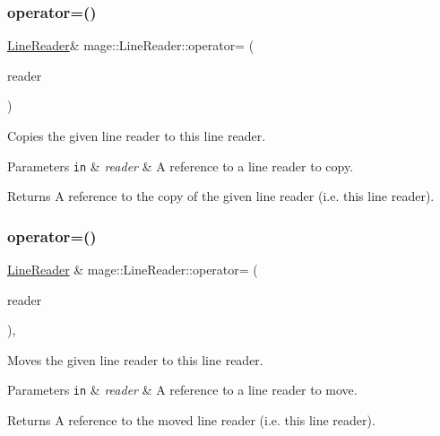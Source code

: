 \subsubsection{\texorpdfstring{operator=()}{operator=()}\hspace{0.1cm}{\footnotesize\ttfamily [1/2]}}
{\footnotesize\ttfamily \hyperlink{classmage_1_1_line_reader}{Line\+Reader}\& mage\+::\+Line\+Reader\+::operator= (\begin{DoxyParamCaption}\item[{const \hyperlink{classmage_1_1_line_reader}{Line\+Reader} \&}]{reader }\end{DoxyParamCaption})\hspace{0.3cm}{\ttfamily [delete]}}

Copies the given line reader to this line reader.


\begin{DoxyParams}[1]{Parameters}
\mbox{\tt in}  & {\em reader} & A reference to a line reader to copy. \\
\hline
\end{DoxyParams}
\begin{DoxyReturn}{Returns}
A reference to the copy of the given line reader (i.\+e. this line reader). 
\end{DoxyReturn}
\hypertarget{classmage_1_1_line_reader_a3ba691cb32a1ab5dcbe75498068c1b86}{}\label{classmage_1_1_line_reader_a3ba691cb32a1ab5dcbe75498068c1b86} 
\subsubsection{\texorpdfstring{operator=()}{operator=()}\hspace{0.1cm}{\footnotesize\ttfamily [2/2]}}
{\footnotesize\ttfamily \hyperlink{classmage_1_1_line_reader}{Line\+Reader} \& mage\+::\+Line\+Reader\+::operator= (\begin{DoxyParamCaption}\item[{\hyperlink{classmage_1_1_line_reader}{Line\+Reader} \&\&}]{reader }\end{DoxyParamCaption})\hspace{0.3cm}{\ttfamily [default]}, {\ttfamily [noexcept]}}

Moves the given line reader to this line reader.


\begin{DoxyParams}[1]{Parameters}
\mbox{\tt in}  & {\em reader} & A reference to a line reader to move. \\
\hline
\end{DoxyParams}
\begin{DoxyReturn}{Returns}
A reference to the moved line reader (i.\+e. this line reader). 
\end{DoxyReturn}
\hypertarget{classmage_1_1_line_reader_adfde21013140a1058d3dd567204abfb5}{}\label{classmage_1_1_line_reader_adfde21013140a1058d3dd567204abfb5} 
